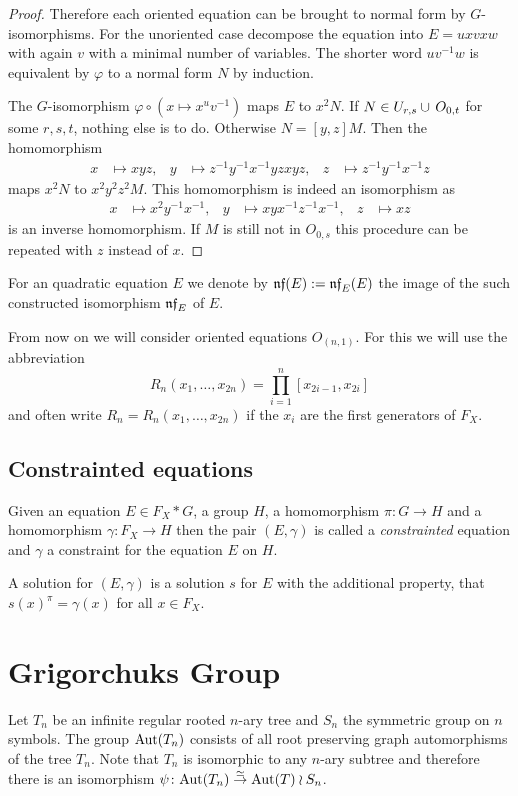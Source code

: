 \documentclass[a4paper,12pt]{article}
\begin{document}
\begin{proof}
 Therefore each oriented equation can be brought to normal form by $G$-iso\-morphisms. 
 For the unoriented case decompose the equation into $E = uxvxw$ with again $v$ with a minimal number of variables. 
 The shorter word $uv^{-1}w$ is equivalent by $\varphi$ to a normal form $N$ by induction.
 
 The $G$-isomorphism $\varphi \circ (x\mapsto x^uv^{-1})$ maps $E$ to $x^2N$. If $N\in U_{r,s}\cup\thinspace O_{0,t}$ for some $r,s,t$, nothing else is to do.
 Otherwise $N=[y,z]M$. Then the homomorphism
 \begin{align*}
  x&\mapsto xyz, & y&\mapsto z^{-1}y^{-1}x^{-1}yzxyz, & z&\mapsto z^{-1}y^{-1}x^{-1}z
 \end{align*}
maps $x^2N$ to $x^2y^2z^2M$. This homomorphism is indeed an isomorphism as 
\begin{align*}
  x&\mapsto x^2y^{-1}x^{-1}, & y&\mapsto xyx^{-1}z^{-1}x^{-1}, & z&\mapsto xz
 \end{align*}
 is an inverse homomorphism. If $M$ is still not in $O_{0,s}$ this procedure can be repeated with $z$ instead of $x$. 
\end{proof}
For an quadratic equation $E$ we denote by $\mathfrak{nf}(E) := \mathfrak{nf}_E(E)$ the image of the such constructed isomorphism $\mathfrak{nf}_E$ of $E$. 

From now on we will consider oriented equations $O_{(n,1)}$. For this we will use the abbreviation 
\[R_n(x_1,\ldots,x_{2n})=\prod_{i=1}^n [x_{2i-1},x_{2i}]\] and often write $R_n=R_n(x_1,\ldots,x_{2n})$ if the $x_i$ are the first generators of $F_X$. 

\subsection{Constrainted equations}
\begin{defi}
 Given an equation $E \in F_X*G$, a group $H$, a homomorphism $\pi\colon G \to H$ and a homomorphism $\gamma\colon F_X \to H$ then the pair $(E,\gamma)$ is called a \emph{constrainted} equation and $\gamma$ a constraint for the equation
 $E$ on $H$.
 
 A solution for $(E,\gamma)$ is a solution $s$ for $E$ with the additional property, that $s(x)^\pi = \gamma(x)$ for all $x\in F_X$.
\end{defi}

\section{Grigorchuks Group}
Let $T_n$ be an infinite regular rooted $n$-ary tree and $S_n$ the symmetric group on $n$ symbols.
The group $\textup{Aut}(T_n)$ consists of all root preserving graph automorphisms of the tree $T_n$. 
Note that $T_n$ is isomorphic to any $n$-ary subtree and therefore there is an isomorphism
$\psi\colon \textup{Aut}(T_n)\stackrel{\simeq}{\to} \textup{Aut}(T)\wr S_n$. 
\end{document}
